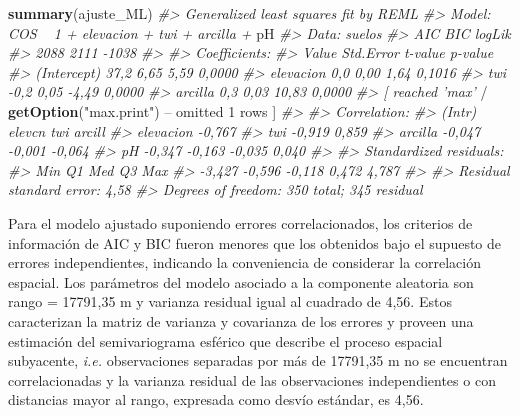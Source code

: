 \documentclass[11pt,b5paper,]{krantz}
\newenvironment{Shaded}{}{}
\newcommand{\CommentTok}[1]{\textcolor[rgb]{0.38,0.63,0.69}{\textit{#1}}}
\newcommand{\DecValTok}[1]{\textcolor[rgb]{0.25,0.63,0.44}{#1}}
\newcommand{\KeywordTok}[1]{\textcolor[rgb]{0.00,0.44,0.13}{\textbf{#1}}}
\newcommand{\NormalTok}[1]{#1}
\newcommand{\OperatorTok}[1]{\textcolor[rgb]{0.40,0.40,0.40}{#1}}
\newcommand{\StringTok}[1]{\textcolor[rgb]{0.25,0.44,0.63}{#1}}
\begin{document}
\begin{Shaded}
\begin{Highlighting}[]
\KeywordTok{summary}\NormalTok{(ajuste_ML)}
\CommentTok{#> Generalized least squares fit by REML}
\CommentTok{#> Model: COS ~ 1 + elevacion + twi + arcilla +}
\NormalTok{pH}
\CommentTok{#> Data: suelos}
\CommentTok{#> AIC BIC logLik}
\CommentTok{#> 2088 2111 -1038}
\CommentTok{#>}
\CommentTok{#> Coefficients:}
\CommentTok{#> Value Std.Error t-value p-value}
\CommentTok{#> (Intercept) 37,2 6,65 5,59 0,0000}
\CommentTok{#> elevacion 0,0 0,00 1,64 0,1016}
\CommentTok{#> twi -0,2 0,05 -4,49 0,0000}
\CommentTok{#> arcilla 0,3 0,03 10,83 0,0000}
\CommentTok{#> [ reached 'max'}
    \OperatorTok{/}\StringTok{ }\KeywordTok{getOption}\NormalTok{(}\StringTok{"max.print"}\NormalTok{) }\OperatorTok{--}
\NormalTok{omitted }\DecValTok{1}\NormalTok{ rows ]}
\CommentTok{#>}
\CommentTok{#> Correlation:}
\CommentTok{#> (Intr) elevcn twi arcill}
\CommentTok{#> elevacion -0,767}
\CommentTok{#> twi -0,919 0,859}
\CommentTok{#> arcilla -0,047 -0,001 -0,064}
\CommentTok{#> pH -0,347 -0,163 -0,035 0,040}
\CommentTok{#>}
\CommentTok{#> Standardized residuals:}
\CommentTok{#> Min Q1 Med Q3 Max}
\CommentTok{#> -3,427 -0,596 -0,118 0,472 4,787}
\CommentTok{#>}
\CommentTok{#> Residual standard error: 4,58}
\CommentTok{#> Degrees of freedom: 350 total; 345 residual}
\end{Highlighting}
\end{Shaded}

Para el modelo ajustado suponiendo errores correlacionados, los criterios de información de AIC y BIC fueron menores que los obtenidos bajo el supuesto de errores independientes, indicando la conveniencia de considerar la correlación espacial. Los parámetros del modelo asociado a la componente aleatoria son rango = 17791,35 m y varianza residual igual al cuadrado de 4,56. Estos caracterizan la matriz de varianza y covarianza de los errores y proveen una estimación del semivariograma esférico que describe el proceso espacial subyacente, \emph{i.e.} observaciones separadas por más de 17791,35 m no se encuentran correlacionadas y la varianza residual de las observaciones independientes o con distancias mayor al rango, expresada como desvío estándar, es 4,56.
\end{document}
